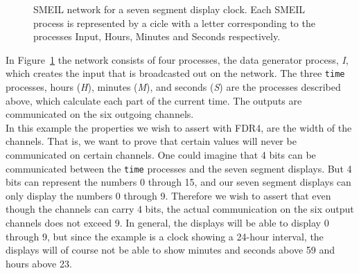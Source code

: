 \begin{figure}[!ht]
  \centering
  \caption{SMEIL network for a seven segment display clock. Each SMEIL process is represented by a cicle with a letter corresponding to the processes Input, Hours, Minutes and Seconds respectively.}
  \label{fig:smeil_network}
\end{figure}

In Figure~\ref{fig:smeil_network} the network consists of four processes, the data generator process, \textit{I}, which creates the input that is broadcasted out on the network. The three \texttt{time} processes, hours (\textit{H}), minutes (\textit{M}), and seconds (\textit{S}) are the processes described above, which calculate each part of the current time. The outputs are communicated on the six outgoing channels.\\

In this example the properties we wish to assert with FDR4, are the width of the channels. That is, we want to prove that certain values will never be communicated on certain channels.
One could imagine that 4 bits can be communicated between the \texttt{time} processes and the seven segment displays. But 4 bits can represent the numbers 0 through 15, and our seven segment displays can only display the numbers 0 through 9. Therefore we wish to assert that even though the channels can carry 4 bits, the actual communication on the six output channels does not exceed 9. In general, the displays will be able to display 0 through 9, but since the example is a clock showing a 24-hour interval, the displays will of course not be able to show minutes and seconds above 59 and hours above 23.

